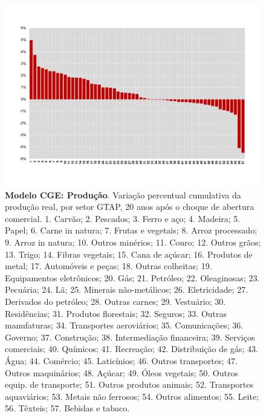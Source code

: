 \documentclass{article}
\begin{document}
\begin{landscape}
\begin{figure}[htbp]
    \centering
    \includegraphics[scale=0.8]{mod_estatico_prod.pdf}
    \caption[Modelo CGE: Produção]{\textbf{Modelo CGE: Produção}. Variação percentual cumulativa da produção real, por setor GTAP, 20 anos após o choque de abertura comercial. \scriptsize{1. Carvão; 2. Pescados; 3. Ferro e aço; 4. Madeira; 5. Papel; 6. Carne in natura; 7. Frutas e vegetais; 8. Arroz processado; 9. Arroz in natura; 10. Outros minérios; 11. Couro; 12. Outros grãos; 13. Trigo; 14. Fibras vegetais; 15. Cana de açúcar; 16. Produtos de metal; 17. Automóveis e peças; 18. Outras colheitas; 19. Equipamentos eletrônicos; 20. Gás; 21. Petróleo; 22. Oleaginosas; 23. Pecuária; 24. Lã; 25. Minerais não-metálicos; 26. Eletricidade; 27. Derivados do petróleo; 28. Outras carnes; 29. Vestuário; 30. Residências; 31. Produtos florestais; 32. Seguros; 33. Outras manufaturas; 34. Transportes aeroviários; 35. Comunicações; 36. Governo; 37. Construção; 38. Intermediação financeira; 39. Serviços comerciais; 40. Químicos; 41. Recreação; 42. Distribuição de gás; 43. Água; 44. Comércio; 45. Laticínios; 46. Outros transportes; 47. Outros maquinários; 48. Açúcar; 49. Óleos vegetais; 50. Outros equip. de transporte; 51. Outros produtos animais; 52. Transportes aquaviários; 53. Metais não ferrosos; 54. Outros alimentos; 55. Leite; 56. Têxteis; 57. Bebidas e tabaco. 
}}
    \label{fig:mod_estatico_prod}
\end{figure}
\end{landscape}
\newpage
\end{document}
